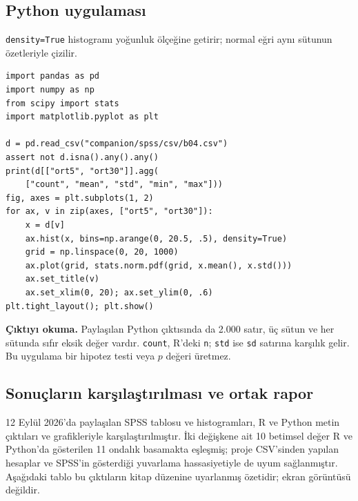 \par\noindent\begin{minipage}{\linewidth}
\subsection{Python uygulaması}
\label{sec:python-b04}

\texttt{density=True} histogramı yoğunluk ölçeğine getirir; normal eğri aynı sütunun özetleriyle çizilir.

\begin{lstlisting}[style=prismPythonApp]
import pandas as pd
import numpy as np
from scipy import stats
import matplotlib.pyplot as plt

d = pd.read_csv("companion/spss/csv/b04.csv")
assert not d.isna().any().any()
print(d[["ort5", "ort30"]].agg(
    ["count", "mean", "std", "min", "max"]))
fig, axes = plt.subplots(1, 2)
for ax, v in zip(axes, ["ort5", "ort30"]):
    x = d[v]
    ax.hist(x, bins=np.arange(0, 20.5, .5), density=True)
    grid = np.linspace(0, 20, 1000)
    ax.plot(grid, stats.norm.pdf(grid, x.mean(), x.std()))
    ax.set_title(v)
    ax.set_xlim(0, 20); ax.set_ylim(0, .6)
plt.tight_layout(); plt.show()
\end{lstlisting}

\textbf{Çıktıyı okuma.} Paylaşılan Python çıktısında da 2.000 satır,
üç sütun ve her sütunda sıfır eksik değer vardır. \texttt{count}, R'deki
\texttt{n}; \texttt{std} ise \texttt{sd} satırına karşılık gelir.
Bu uygulama bir hipotez testi veya $p$ değeri üretmez.
\end{minipage}\par

\subsection{Sonuçların karşılaştırılması ve ortak rapor}
12 Eylül 2026'da paylaşılan SPSS tablosu ve histogramları, R ve Python
metin çıktıları ve grafikleriyle karşılaştırılmıştır. İki değişkene ait
10 betimsel değer R ve Python'da gösterilen 11 ondalık basamakta
eşleşmiş; proje CSV'sinden yapılan hesaplar ve SPSS'in gösterdiği
yuvarlama hassasiyetiyle de uyum sağlanmıştır. Aşağıdaki tablo bu
çıktıların kitap düzenine uyarlanmış özetidir; ekran görüntüsü değildir.

